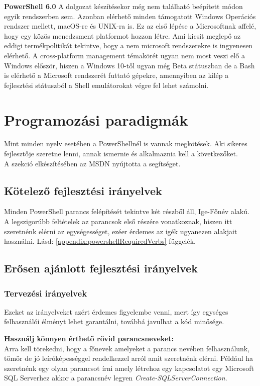 \documentclass[12pt,oneside,justify,table]{book}
\begin{document}
\noindent\textbf{PowerShell 6.0}
\newline A dolgozat készítésekor még nem található beépített módon egyik rendszerben sem. Azonban elérhető minden támogatott Windows Operációs rendszer mellett, macOS-re és UNIX-ra is. Ez az első lépése a Microsoftnak affelé, hogy egy közös menedzsment platformot hozzon létre. Ami kicsit meglepő az eddigi termékpolitikát tekintve, hogy a nem microsoft rendszerekre is ingyenesen elérhető.
A cross-platform management témakörét ugyan nem most veszi elő a Windows először, hiszen a Windows 10-től ugyan még Beta státuszban de a Bash is elérhető a Microsoft rendszerét futtató gépekre, amennyiben az kilép a fejlesztési státuszból a Shell emulátorokat végre fel lehet számolni.

\section{Programozási paradigmák}
Mint minden nyelv esetében a PowerShellnél is vannak megkötések. Aki sikeres fejlesztője szeretne lenni, annak ismernie és alkalmaznia kell a következőket. \\

\noindent A szekció elkészítésében az MSDN nyújtotta a segítséget. \cite{PowerShellGuidelines}
\subsection{Kötelező fejlesztési irányelvek}
Minden PowerShell parancs felépítését tekintve két részből áll, Ige-Főnév alakú. A legszigorúbb feltételek az parancsok első részére vonatkoznak, hiszen itt szeretnénk elérni az egységességet, ezéer érdemes az igék ugyanezen alakjait használni. 
Lásd: \ref{appendix:powershellRequiredVerbs} függelék.
\subsection{Erősen ajánlott fejlesztési irányelvek}
\subsubsection{Tervezési irányelvek}
Ezeket az irányelveket azért érdemes figyelembe venni, mert így egységes felhasználói élményt lehet garantálni, továbbá javulhat a kód minősége.

\noindent \textbf{Használj könnyen érthető rövid parancsneveket:}\\
Arra kell törekedni, hogy a főnevek amelyeket a parancs nevében felhasználunk, tömör de jó leíróképességgel rendelkezzel arról amit szeretnénk elérni. Például ha szeretnénk egy olyan parancsot írni amely létrehoz egy kapcsolatot egy Microsoft SQL Serverhez akkor a parancsnév legyen \textit{Create-SQLServerConnection}. \\
\end{document}
